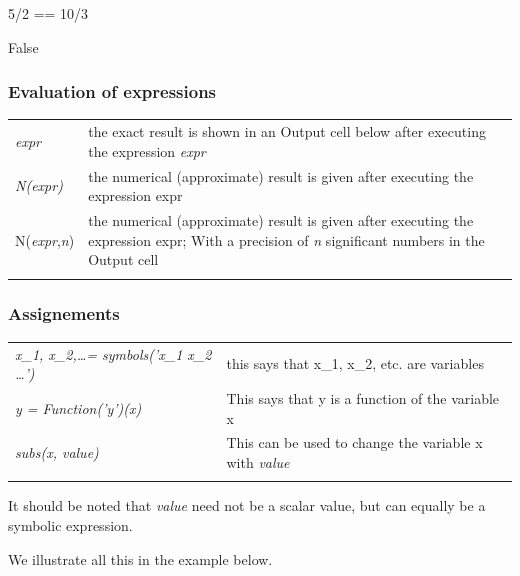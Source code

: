 \begin{pyin}
5/2 == 10/3
\end{pyin}
\begin{pyout}
False
\end{pyout}


\subsubsection{Evaluation of expressions}

\begin{tabular}{>{\hfill}p{5cm}p{12cm}}
	\textit{expr} 			&	the exact result is shown in an Output cell below after executing the expression \textit{expr} \\
	\textit{N(expr)}	&	the numerical (approximate) result is given after executing the expression expr \\
	N(\textit{expr},\textit{n})			&	the numerical (approximate) result is given after executing the expression expr;
	With a precision of \textit{n} significant numbers in the Output cell\\
	\multicolumn{2}{l}{} 
\end{tabular}

\subsubsection{Assignements}
\begin{tabular}{>{\hfill}p{5cm}p{12cm}}
    \textit{x\_1, x\_2,\ldots = symbols('x\_1 x\_2 \ldots')}		&	this says that x\_1, x\_2, etc. are variables\\
	\textit{y = Function('y')(x)}		&	This says that y is a function of the variable x\\
	\textit{subs(x, value)}		&	This can be used to change the variable x with \textit{value}\\
	\multicolumn{2}{l}{} 
\end{tabular}

It should be noted that \textit{value} need not be a scalar value, but can equally be a symbolic expression.

We illustrate all this in the example below. 

